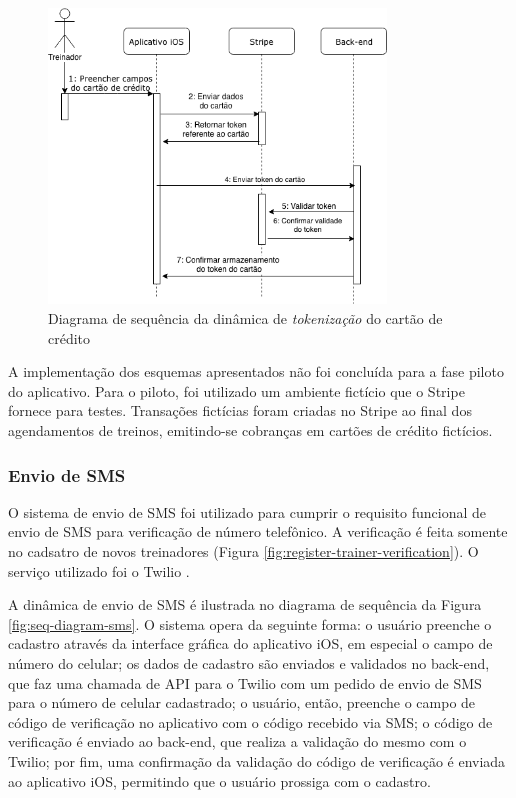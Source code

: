 \begin{figure}[H]
    \centering
    \includegraphics[width=0.8\textwidth]{pfc/figuras/seq-diagram-token.png}
    \caption{Diagrama de sequência da dinâmica de \textit{tokenização} do cartão de crédito}
    \label{fig:seq-diagram-token}
\end{figure}

A implementação dos esquemas apresentados não foi concluída para a fase piloto do aplicativo. Para o piloto, foi utilizado um ambiente fictício que o Stripe fornece para testes. Transações fictícias foram criadas no Stripe ao final dos agendamentos de treinos, emitindo-se cobranças em cartões de crédito fictícios.

\subsubsection{Envio de SMS}
O sistema de envio de SMS foi utilizado para cumprir o requisito funcional de envio de SMS para verificação de número telefônico. A verificação é feita somente no cadsatro de novos treinadores (Figura \ref{fig:register-trainer-verification}). O serviço utilizado foi o Twilio .

A dinâmica de envio de SMS é ilustrada no diagrama de sequência da Figura \ref{fig:seq-diagram-sms}. O sistema opera da seguinte forma: o usuário preenche o cadastro através da interface gráfica do aplicativo iOS, em especial o campo de número do celular; os dados de cadastro são enviados e validados no back-end, que faz uma chamada de API para o Twilio com um pedido de envio de SMS para o número de celular cadastrado; o usuário, então, preenche o campo de código de verificação no aplicativo com o código recebido via SMS; o código de verificação é enviado ao back-end, que realiza a validação do mesmo com o Twilio; por fim, uma confirmação da validação do código de verificação é enviada ao aplicativo iOS, permitindo que o usuário prossiga com o cadastro.

